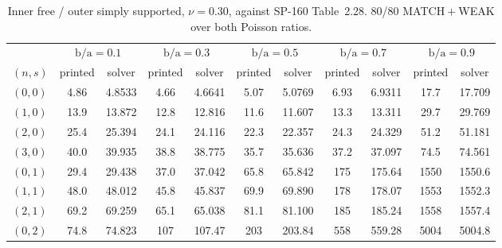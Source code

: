 \documentclass[11pt]{article}
\newcommand{\ba}{\mbox{b/a}}
\begin{document}
\begin{table}[htbp]\centering\footnotesize
\caption{Inner free / outer simply supported, $\nu=0.30$, against
SP-160 Table~2.28. 80/80 MATCH${}+{}$WEAK over both Poisson ratios.}
\label{tab:sm-t228-nu30}
\begin{tabular}{lcccccccccc}
\toprule
& \multicolumn{2}{c}{$\ba=0.1$} & \multicolumn{2}{c}{$\ba=0.3$}
& \multicolumn{2}{c}{$\ba=0.5$} & \multicolumn{2}{c}{$\ba=0.7$}
& \multicolumn{2}{c}{$\ba=0.9$}\\
\cmidrule(lr){2-3}\cmidrule(lr){4-5}\cmidrule(lr){6-7}\cmidrule(lr){8-9}\cmidrule(lr){10-11}
$(n,s)$ & printed & solver & printed & solver & printed & solver
& printed & solver & printed & solver\\
\midrule
$(0,0)$ & 4.86 & 4.8533 & 4.66 & 4.6641 & 5.07 & 5.0769 & 6.93 & 6.9311 & 17.7 & 17.709 \\
$(1,0)$ & 13.9 & 13.872 & 12.8 & 12.816 & 11.6 & 11.607 & 13.3 & 13.311 & 29.7 & 29.769 \\
$(2,0)$ & 25.4 & 25.394 & 24.1 & 24.116 & 22.3 & 22.357 & 24.3 & 24.329 & 51.2 & 51.181 \\
$(3,0)$ & 40.0 & 39.935 & 38.8 & 38.775 & 35.7 & 35.636 & 37.2 & 37.097 & 74.5 & 74.561 \\
$(0,1)$ & 29.4 & 29.438 & 37.0 & 37.042 & 65.8 & 65.842 & 175 & 175.64 & 1550 & 1550.6 \\
$(1,1)$ & 48.0 & 48.012 & 45.8 & 45.837 & 69.9 & 69.890 & 178 & 178.07 & 1553 & 1552.3 \\
$(2,1)$ & 69.2 & 69.259 & 65.1 & 65.038 & 81.1 & 81.100 & 185 & 185.24 & 1558 & 1557.4 \\
$(0,2)$ & 74.8 & 74.823 & 107 & 107.47 & 203 & 203.84 & 558 & 559.28 & 5004 & 5004.8 \\
\bottomrule
\end{tabular}
\end{table}
\end{document}
